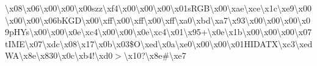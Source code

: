 \begin{DoxyCompactItemize}
\textbackslash{}x08\textbackslash{}x06\textbackslash{}x00\textbackslash{}x00\textbackslash{}x00szz\textbackslash{}xf4\textbackslash{}x00\textbackslash{}x00\textbackslash{}x00\textbackslash{}x01s\+R\+G\+B\textbackslash{}x00\textbackslash{}xae\textbackslash{}xce\textbackslash{}x1c\textbackslash{}xe9\textbackslash{}x00\textbackslash{}x00\textbackslash{}x00\textbackslash{}x06b\+K\+G\+D\textbackslash{}x00\textbackslash{}xff\textbackslash{}x00\textbackslash{}xff\textbackslash{}x00\textbackslash{}xff\textbackslash{}xa0\textbackslash{}xbd\textbackslash{}xa7\textbackslash{}x93\textbackslash{}x00\textbackslash{}x00\textbackslash{}x00\textbackslash{}x09p\+H\+Ys\textbackslash{}x00\textbackslash{}x00\textbackslash{}x0e\textbackslash{}xc4\textbackslash{}x00\textbackslash{}x00\textbackslash{}x0e\textbackslash{}xc4\textbackslash{}x01\textbackslash{}x95+\textbackslash{}x0e\textbackslash{}x1b\textbackslash{}x00\textbackslash{}x00\textbackslash{}x00\textbackslash{}x07t\+I\+M\+E\textbackslash{}x07\textbackslash{}xdc\textbackslash{}x08\textbackslash{}x17\textbackslash{}x0b\textbackslash{}x03\$\+O\textbackslash{}xed\textbackslash{}x0a\textbackslash{}xe0\textbackslash{}x00\textbackslash{}x00\textbackslash{}x01\+H\+I\+D\+A\+T\+X\textbackslash{}xc3\textbackslash{}xed\+W\+A\textbackslash{}x8e\textbackslash{}x830\textbackslash{}x0c\textbackslash{}xb4!\textbackslash{}xd0$>$\textbackslash{}x10?\textbackslash{}x8e\#\textbackslash{}xe7 
\end{DoxyCompactItemize}
